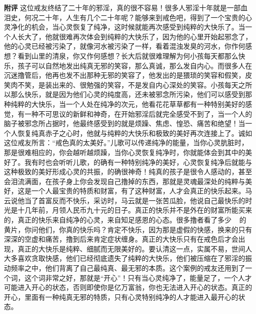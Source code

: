 \begin{case}
    \textbf{附评} 这位戒友终结了二十年的邪淫，真的很不容易！很多人邪淫十年就是一部血泪史，何况二十年，人生有几个二十年呢？能够来到戒色吧，得到了一个宝贵的心灵净化的机会，当心灵恢复了纯净，这时候就能再次感受到纯粹的大快乐了。当一个人长大了，他就很难再次体会到纯粹的大快乐了，因为他的心里开始起邪念了，他的心灵已经被污染了，就像河水被污染了一样，看着混浊发臭的河水，你作何感想？看到山里的清泉，你又作何感想？长大后就很难理解为何小孩每天都那么快乐，孩子可以自然地发出纯真无邪的笑容，那么真诚，那么发自内心。而很多人在沉迷撸管后，他再也发不出那种无邪的笑容了，他发出的是猥琐的笑容和假笑，皮笑肉不笑，是装出来的、很勉强的笑容，不是发自内心深处的笑容。小孩每天之所以那么快乐，就是因为他们心灵的纯度高，还未被邪念所污染，他们可以感受到那种纯粹的大快乐，当一个人处在纯净的次元，他看花花草草都有一种特别美好的感觉，有一种不可思议的新鲜和神奇，在开始邪淫后就完全感受不到了，当一个人的脑子被邪念所占据时，他最终感受到的就是烦躁、焦虑、惶恐、痛苦和绝望！当一个人恢复纯真赤子之心时，他就与纯粹的大快乐和极致的美好再次连接上了。诚如这位戒友所言：“戒色真的太美好。”儿歌可以传递纯净的能量，当你心灵肮脏时，那是很难相应的，你会越听越烦躁，当你心灵恢复纯净时，你就能体会到其中的美好了。我有时也会听听儿歌，的确有一种特别纯净的美好，心灵恢复纯净后就能与这种极致的美好形成心灵的共振，的确很神奇！纯真的孩子是很令人感动的，甚至会泪流满面，在孩子身上你会发现自己撸掉的东西，那就是灵魂最深处的纯粹与美好，这是一个人最宝贵的特质和财富，有了这种财富，人才会真正的快乐起来。马云说他当了首富反而不快乐，采访时，马云就是一张苦瓜脸，他说自己最快乐的时光是十几年前，月领人民币九十元的日子。真正的快乐并不是外在的财富所能买来的，真正的快乐来自纯净的心灵，来自知足感恩的心态。很多撸者看了多少 \unit{\giga\byte} 的黄片，你问他们，你真的快乐吗？肯定不快乐，因为那是虚假的快感，换来的只有深深的空虚和痛苦，撸到后来肯定症状缠身。真正的大快乐只有在戒色后才会出现，真正的大快乐是纯粹、细腻而无限美好的。要认清这一点，实属不易，世间人大多喜欢贪取快感，他们已经彻底遗失了纯粹的大快乐，他们被压缩在了邪淫的振动频率之中，他们背离了自己最纯真、最无邪的本质。这个案例的戒友还用到了一个词，这个词非常之好，那就是“开心”！只有当心灵纯净了，能量足了，一个人才可能进入开心的状态，否则即使你是亿万富翁，你也无法进入开心的状态。真正的开心，里面有一种纯真无邪的特质，只有心灵特别纯净的人才能进入最开心的状态。
\end{case}

